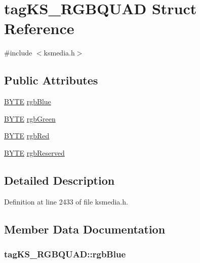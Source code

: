 \hypertarget{structtag_k_s___r_g_b_q_u_a_d}{}\section{tag\+K\+S\+\_\+\+R\+G\+B\+Q\+U\+AD Struct Reference}
\label{structtag_k_s___r_g_b_q_u_a_d}


{\ttfamily \#include $<$ksmedia.\+h$>$}

\subsection*{Public Attributes}
\begin{DoxyCompactItemize}
\item 
\hyperlink{mapinls_8h_a4ae1dab0fb4b072a66584546209e7d58}{B\+Y\+TE} \hyperlink{structtag_k_s___r_g_b_q_u_a_d_a117b30278bf9fde9991a593712df32e8}{rgb\+Blue}
\item 
\hyperlink{mapinls_8h_a4ae1dab0fb4b072a66584546209e7d58}{B\+Y\+TE} \hyperlink{structtag_k_s___r_g_b_q_u_a_d_ae8d0c37aacb96c06bf371a12ea9d8ec2}{rgb\+Green}
\item 
\hyperlink{mapinls_8h_a4ae1dab0fb4b072a66584546209e7d58}{B\+Y\+TE} \hyperlink{structtag_k_s___r_g_b_q_u_a_d_af66dc1cfd7c8b22ef1072893439d1fb3}{rgb\+Red}
\item 
\hyperlink{mapinls_8h_a4ae1dab0fb4b072a66584546209e7d58}{B\+Y\+TE} \hyperlink{structtag_k_s___r_g_b_q_u_a_d_a330618ebd97c30b22d649e9db6708b81}{rgb\+Reserved}
\end{DoxyCompactItemize}


\subsection{Detailed Description}


Definition at line 2433 of file ksmedia.\+h.



\subsection{Member Data Documentation}
\subsubsection[{\texorpdfstring{rgb\+Blue}{rgbBlue}}]{ tag\+K\+S\+\_\+\+R\+G\+B\+Q\+U\+A\+D\+::rgb\+Blue}\hypertarget{structtag_k_s___r_g_b_q_u_a_d_a117b30278bf9fde9991a593712df32e8}{}\label{structtag_k_s___r_g_b_q_u_a_d_a117b30278bf9fde9991a593712df32e8}


